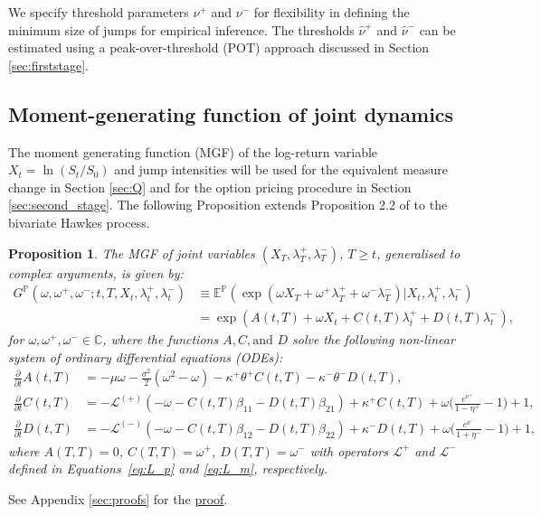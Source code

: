 \documentclass[11pt,a4paper]{article}
\numberwithin{equation}{section}
\newtheorem{proposition}[theorem]{Proposition}
\theoremstyle{remark}
\theoremstyle{definition}
\newcommand{\E}{{\mathbb{E}}}
\begin{document}
We specify threshold parameters $\nu^+$ and $\nu^-$ for flexibility in defining the minimum size of jumps for empirical inference. The thresholds $\hat \nu^+$ and $\hat \nu^-$ can be estimated using a peak-over-threshold (POT) approach discussed in Section \ref{sec:firststage}.

\subsection{Moment-generating function of joint dynamics}

The moment generating function (MGF) of the log-return variable $X_t=\ln (S_t/S_0)$ and jump intensities will be used for the equivalent measure change in Section \ref{sec:Q} and for the option pricing procedure in Section \ref{sec:second_stage}. The following Proposition extends Proposition 2.2 of \cite{hainaut2018hedging} to the bivariate Hawkes process.
\begin{proposition}\label{prop:MGF}
    The MGF of joint variables $(X_T, \lambda^+_T, \lambda^-_T)$, $T\geq t$, generalised to complex arguments, is given by:
    \begin{equation}\label{eq:mgf_p}
    \begin{split}
        G^{\mathbb{P}}(\omega,\omega^+,\omega^-;t,T,X_t,\lambda_t^+, \lambda_t^-) & \equiv\E^{\mathbb{P}}\left(\exp(\omega X_T + \omega^+\lambda^+_T + \omega^-\lambda^-_T)\big|X_t, \lambda^+_t, \lambda^-_t\right)\\
        & = \exp\left(A(t,T)+ \omega X_t + C(t,T)\lambda_t^+ + D(t,T)\lambda_t^-\right),
    \end{split}
    \end{equation}
    for $\omega, \omega^+, \omega^- \in \mathbb{C}$, where the functions $A, C,\text{and } D$ solve the following non-linear system of ordinary differential equations (ODEs):
    \begin{equation*}
    \begin{split}
          \frac{\partial}{\partial t} A(t,T) &= - \mu \omega - \frac{\sigma^2}{2}\left(\omega^2-\omega\right) - \kappa^+\theta^+C(t,T) - \kappa^-\theta^-D(t,T), \\
          \frac{\partial}{\partial t} C(t,T) &= -\mathcal{L}^{(+)}(-\omega-C(t,T)\beta_{11}-D(t,T)\beta_{21}) + \kappa^+C(t,T) + \omega\Big(\frac{e^{\nu^+}}{1-\eta^+}-1\Big) + 1,\\
          \frac{\partial}{\partial t} D(t,T) &= -\mathcal{L}^{(-)}(-\omega-C(t,T)\beta_{12}-D(t,T)\beta_{22}) + \kappa^-D(t,T) + \omega\Big(\frac{e^{\nu^-}}{1+\eta^-}-1\Big) + 1,
    \end{split}
    \end{equation*}
    where $A(T,T) =0$, $C(T,T)=\omega^+$, $D(T,T)=\omega^-$ with operators $\mathcal L^+$ and $\mathcal L^-$ defined in Equations~\eqref{eq:L_p} and \eqref{eq:L_m}, respectively.
\end{proposition}
See Appendix \ref{sec:proofs} for the \hyperref[proof:prop:MGF]{proof}.
\end{document}
